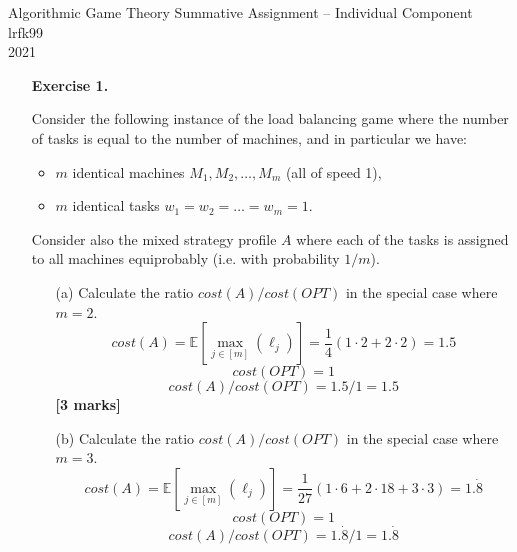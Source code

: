 \documentclass{article}
\begin{document}
\begin{center}
	\LARGE{Algorithmic Game Theory Summative Assignment -- Individual Component}\\[0.1cm]
	\Large{lrfk99}\\[0.1cm]
	2021\\[0.5cm]
\end{center}

\begin{enumerate}
	
	\item[\textbf{Exercise 1.}]   %
	
	Consider the following instance of the load balancing game where the number of tasks is equal to the number of machines, and in particular we have:
	\begin{itemize}
		\item $m$ identical machines $M_1, M_2, \dots, M_m$ (all of speed 1),
		\item $m$ identical tasks $w_1 = w_2 = \dots = w_m = 1$.
	\end{itemize}
	Consider also the mixed strategy profile $A$ where each of the tasks is assigned to all machines equiprobably (i.e. with probability $1/m$). 
	\begin{enumerate}
		\item[(a)] Calculate the ratio $cost(A)/cost(OPT)$ in the special case where $m=2$.
		\begin{equation*}
			cost(A) = \mathbb{E}[\max_{j \in [m]}{(\ell_j)}] = \frac{1}{4}(1 \cdot 2 + 2 \cdot 2) = 1.5
		\end{equation*}
		\begin{equation*}
			cost(OPT) = 1
		\end{equation*}
		\begin{equation*}
			cost(A)/cost(OPT) = 1.5/1 = 1.5
		\end{equation*}
		\hfill{\bf [3 marks]}\smallskip 
		\item[(b)] Calculate the ratio $cost(A)/cost(OPT)$ in the special case where $m=3$.
		\begin{equation*}
			cost(A) = \mathbb{E}[\max_{j \in [m]}{(\ell_j)}] = \frac{1}{27}(1 \cdot 6 + 2 \cdot 18 + 3 \cdot 3) = 1.\dot{8}
		\end{equation*}
		\begin{equation*}
			cost(OPT) = 1
		\end{equation*}
		\begin{equation*}
			cost(A)/cost(OPT) = 1.\dot{8}/1 = 1.\dot{8}
		\end{equation*}

\end{enumerate}
\end{enumerate}
\end{document}
